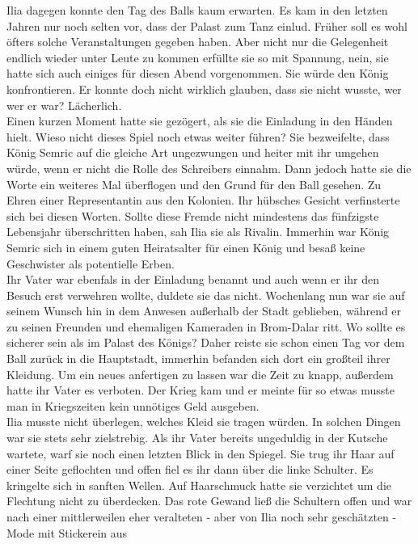 Ilia dagegen konnte den Tag des Balls kaum erwarten. Es kam in den letzten Jahren nur noch selten 
vor, dass der Palast zum Tanz einlud. Früher soll es wohl öfters solche Veranstaltungen gegeben 
haben. Aber nicht nur die Gelegenheit endlich wieder unter Leute zu kommen erfüllte sie so mit 
Spannung, nein, sie hatte sich auch einiges für diesen Abend vorgenommen. Sie würde den König 
konfrontieren. Er konnte doch nicht wirklich glauben, dass sie nicht wusste, wer wer er war? 
Lächerlich.\\
Einen kurzen Moment hatte sie gezögert, als sie die Einladung in den Händen hielt. Wieso nicht 
dieses Spiel noch etwas weiter führen? Sie bezweifelte, dass König Semric auf die gleiche Art 
ungezwungen und heiter mit ihr umgehen würde, wenn er nicht die Rolle des Schreibers einnahm. Dann 
jedoch hatte sie die Worte ein weiteres Mal überflogen und den Grund für den Ball gesehen. Zu Ehren 
einer Representantin aus den Kolonien. Ihr hübsches Gesicht verfinsterte sich bei diesen Worten. 
Sollte diese Fremde nicht mindestens das fünfzigste Lebensjahr überschritten haben, sah Ilia sie 
als Rivalin. Immerhin war König Semric sich in einem guten Heiratsalter für einen König und besaß 
keine Geschwister als potentielle Erben.\\
Ihr Vater war ebenfals in der Einladung benannt und auch wenn er ihr den Besuch erst verwehren 
wollte, duldete sie das nicht. Wochenlang nun war sie auf seinem Wunsch hin in dem Anwesen 
außerhalb der Stadt geblieben, während er zu seinen Freunden und ehemaligen Kameraden in Brom-Dalar 
ritt. Wo sollte es sicherer sein als im Palast des Königs? Daher reiste sie schon einen Tag vor dem 
Ball zurück in die Hauptstadt, immerhin befanden sich dort ein großteil ihrer Kleidung. Um ein 
neues anfertigen zu lassen war die Zeit zu knapp, außerdem hatte ihr Vater es verboten. Der Krieg 
kam und er meinte für so etwas musste man in Kriegszeiten kein unnötiges Geld ausgeben.\\
Ilia musste nicht überlegen, welches Kleid sie tragen würden. In solchen Dingen war sie stets sehr 
zielstrebig. Als ihr Vater bereits ungeduldig in der Kutsche wartete, warf sie noch einen letzten 
Blick in den Spiegel. Sie trug ihr Haar auf einer Seite geflochten und offen fiel es ihr dann über 
die linke Schulter. Es kringelte sich in sanften Wellen. Auf Haarschmuck hatte sie verzichtet um 
die Flechtung nicht zu überdecken. Das rote Gewand ließ die Schultern offen und war nach einer 
mittlerweilen eher veralteten - aber von Ilia noch sehr geschätzten - Mode mit Stickerein aus 
